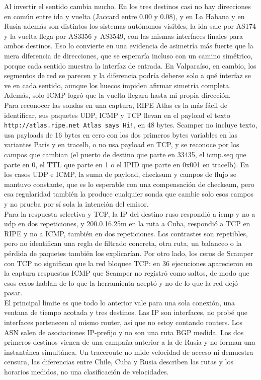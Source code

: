 Al invertir el sentido cambia mucho. En los tres destinos casi no hay direcciones en común entre ida y vuelta (Jaccard entre 0.00 y  0.08), y en La Habana y en Rusia además son distintos los sistemas autónomos visibles, la ida sale por AS174 y la vuelta llega por AS3356 y AS3549, con las mismas interfaces finales para ambos destinos. Eso lo convierte en una evidencia de asimetría más fuerte que la mera diferencia de direcciones, que se esperaría incluso con un camino simétrico, porque cada sentido muestra la interfaz de entrada. En Valparaíso, en cambio, los segmentos de red se parecen y la diferencia podría deberse solo a qué interfaz se ve en cada sentido, aunque los huecos impiden afirmar simetría completa. Además, solo ICMP logró que la vuelta llegara hasta mi propia dirección. \\

Para reconocer las sondas en una captura, RIPE Atlas es la más fácil de identificar, sus paquetes UDP, ICMP y TCP llevan en el payload el texto \verb|http://atlas.ripe.net Atlas says Hi!|, en 48 bytes. Scamper no incluye texto, usa payloads de 16 bytes en cero con los dos primeros bytes variables en las variantes Paris y en tracelb, o no usa payload en TCP, y se reconoce por los campos que cambian (el puerto de destino que parte en 33435, el icmp.seq que parte en 0, el TTL que parte en 1 o el IPID que parte en 0x001 en tracelb).
En los casos UDP e ICMP, la suma de payload, checksum y campos de flujo se mantuvo constante, que es lo esperable con una compensación de checksum, pero esa regularidad también la produce cualquier sonda que cambie solo esos campos y no prueba por sí sola la intención del emisor. \\

Para la respuesta selectiva y TCP, la IP del destino ruso respondió a icmp y no a udp en dos repeticiones, y 200.0.16.25m en la ruta a Cuba, respondió a TCP en RIPE y no a ICMP, también en dos repeticiones. Los contrastes son repetibles, pero no identifican una regla de filtrado concreta, otra ruta, un balanceo o la pérdida de paquetes también los explicarían. Por otro lado, los ceros de Scamper con TCP no significan que la red bloquee TCP: en 36 ejecuciones aparecieron en la captura respuestas ICMP que Scamper no registró como saltos, de modo que esos ceros hablan de lo que la herramienta aceptó y no de lo que la red dejó pasar. \\

El principal límite es que todo lo anterior vale para una sola conexión, una ventana de tiempo acotada y tres destinos. Las IP son interfaces, no probé que interfaces pertenecen al mismo router, así que no estoy contando routers. Los ASN salen de asociaciones IP-prefijo y no son una ruta BGP medida. Los dos primeros destinos vienen de una campaña anterior a la de Rusia y no forman una instantánea simultánea. Un traceroute no mide velocidad de acceso ni demuestra censura, las diferencias entre Chile, Cuba y Rusia describen las rutas y los horarios medidos, no una clasificación de velocidades.\\

